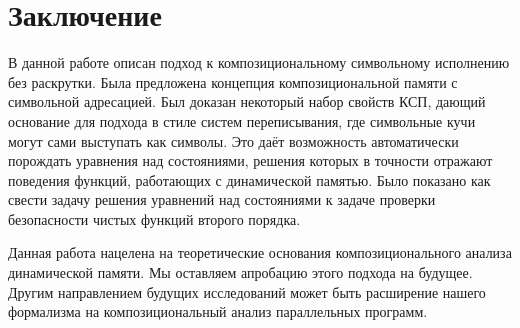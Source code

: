 \section{Заключение}

В данной работе описан подход к композициональному символьному исполнению без раскрутки. Была предложена концепция композициональной памяти с символьной адресацией. Был доказан некоторый набор свойств КСП, дающий основание для подхода в стиле систем переписывания, где символьные кучи могут сами выступать как символы. Это даёт возможность автоматически порождать уравнения над состояниями, решения которых в точности отражают поведения функций, работающих с динамической памятью. Было показано как свести задачу решения уравнений над состояниями к задаче проверки безопасности чистых функций второго порядка.

Данная работа нацелена на теоретические основания композиционального анализа динамической памяти. Мы оставляем апробацию этого подхода на будущее. Другим направлением будущих исследований может быть расширение нашего формализма на композициональный анализ параллельных программ.